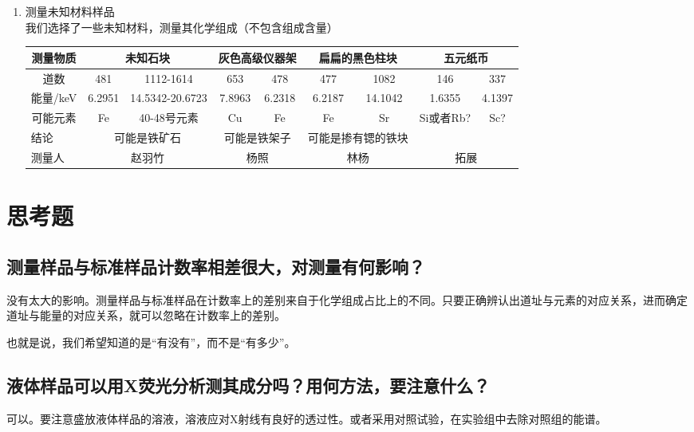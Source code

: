 \documentclass[a4paper]{article}
\begin{document}
\begin{enumerate}
\item 测量未知材料样品\\
我们选择了一些未知材料，测量其化学组成（不包含组成含量）
\begin{table}[]
	\begin{tabular}{|c|cc|cc|cc|cc|}
	\hline
	测量物质                     & \multicolumn{2}{c|}{未知石块}               & \multicolumn{2}{c|}{灰色高级仪器架}       & \multicolumn{2}{c|}{扁扁的黑色柱块}     & \multicolumn{2}{c|}{五元纸币}       \\ \hline
	道数                       & \multicolumn{1}{c|}{481} & 1112-1614 & \multicolumn{1}{c|}{653} & 478 & \multicolumn{1}{c|}{477} & 1082 & \multicolumn{1}{c|}{146} & 337                    \\ \hline
	能量/keV                       & \multicolumn{1}{c|}{6.2951}    & 14.5342-20.6723             & \multicolumn{1}{c|}{7.8963}    &  6.2318   & \multicolumn{1}{c|}{6.2187}    & 14.1042     & \multicolumn{1}{c|}{1.6355}    &  4.1397   \\ \hline
	可能元素                     & \multicolumn{1}{c|}{Fe}  & 40-48号元素     & \multicolumn{1}{c|}{Cu}    & Fe  & \multicolumn{1}{c|}{Fe}  & Sr  & \multicolumn{1}{c|}{Si或者Rb?}    & Sc?  \\ \hline
	\multicolumn{1}{|l|}{结论} & \multicolumn{2}{c|}{可能是铁矿石}          & \multicolumn{2}{c|}{可能是铁架子}          & \multicolumn{2}{c|}{可能是掺有锶的铁块}           & \multicolumn{2}{c|}{}          \\ \hline
	\multicolumn{1}{|l|}{测量人}   & \multicolumn{2}{c|}{赵羽竹}                & \multicolumn{2}{c|}{杨照}        & \multicolumn{2}{c|}{林杨}         & \multicolumn{2}{c|}{拓展}  \\ \hline
\end{tabular}
\end{table}
\end{enumerate}

\section{思考题}
\subsection{测量样品与标准样品计数率相差很大，对测量有何影响？}
没有太大的影响。测量样品与标准样品在计数率上的差别来自于化学组成占比上的不同。只要正确辨认出道址与元素的对应关系，进而确定道址与能量的对应关系，就可以忽略在计数率上的差别。

也就是说，我们希望知道的是“有没有”，而不是“有多少”。
\subsection{液体样品可以用X荧光分析测其成分吗？用何方法，要注意什么？}
可以。要注意盛放液体样品的溶液，溶液应对X射线有良好的透过性。或者采用对照试验，在实验组中去除对照组的能谱。

\nocite{jiaocai}

\end{document}
